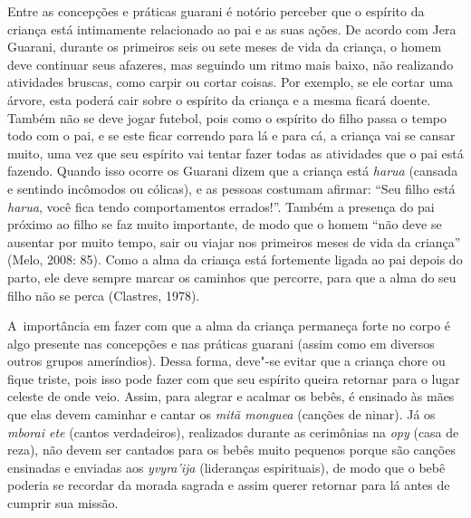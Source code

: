 Entre as concepções e práticas guarani é notório perceber que o espírito
da criança está intimamente relacionado ao pai e as suas ações. De
acordo com Jera Guarani, durante os primeiros seis ou sete meses de
vida da criança, o homem deve continuar seus afazeres, mas seguindo um
ritmo mais baixo, não realizando atividades bruscas, como carpir ou
cortar coisas. Por exemplo, se ele cortar uma árvore, esta poderá cair
sobre o espírito da criança e a mesma ficará doente. Também não se deve
jogar futebol, pois como o espírito do filho passa o tempo todo com o
pai, e se este ficar correndo para lá e para cá, a criança vai se
cansar muito, uma vez que seu espírito vai tentar fazer todas as
atividades que o pai está fazendo. Quando isso ocorre os Guarani dizem
que a criança está \emph{harua} (cansada e sentindo incômodos ou cólicas), e
as pessoas costumam afirmar: ``Seu filho está \emph{harua}, você fica tendo
comportamentos errados!''. Também a presença do pai próximo ao filho se
faz muito importante, de modo que o homem ``não deve se ausentar por
muito tempo, sair ou viajar nos primeiros meses de vida da criança''
(Melo, 2008: 85). Como a alma da criança está fortemente ligada ao pai
depois do parto, ele deve sempre marcar os caminhos que percorre, para
que a alma do seu filho não se perca (Clastres, 1978).

A~importância em fazer com que a alma da criança permaneça forte no
corpo é algo presente nas concepções e nas práticas guarani (assim como
em diversos outros grupos ameríndios). Dessa forma, deve"-se evitar que a
criança chore ou fique triste, pois isso pode fazer com que seu
espírito queira retornar para o lugar celeste de onde veio. Assim, para
alegrar e acalmar os bebês, é ensinado às mães que elas devem caminhar
e cantar os \emph{mitã monguea} (canções de ninar). Já os \emph{mborai ete} (cantos
verdadeiros), realizados durante as cerimônias na \emph{opy} (casa de reza),
não devem ser cantados para os bebês muito pequenos porque são canções
ensinadas e enviadas aos \emph{yvyra’ija} (lideranças espirituais), de modo
que o bebê poderia se recordar da morada sagrada e assim querer
retornar para lá antes de cumprir sua missão.


